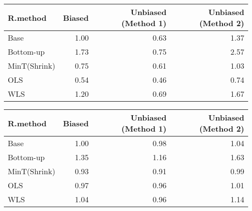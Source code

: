 \documentclass[
]{article}
\begin{document}
\begin{tabular}{l|r|r|r}
\hline
R.method & Biased & Unbiased (Method 1) & Unbiased (Method 2)\\\hline
Base & 1.00 & 0.63 & 1.37\\\hline
Bottom-up & 1.73 & 0.75 & 2.57\\\hline
MinT(Shrink) & 0.75 & 0.61 & 1.03\\\hline
OLS & 0.54 & 0.46 & 0.74\\\hline
WLS & 1.20 & 0.69 & 1.67\\\hline
\end{tabular}

\begin{tabular}{l|r|r|r}
\hline
R.method & Biased & Unbiased (Method 1) & Unbiased (Method 2)\\
\hline
Base & 1.00 & 0.98 & 1.04\\\hline
Bottom-up & 1.35 & 1.16 & 1.63\\\hline
MinT(Shrink) & 0.93 & 0.91 & 0.99\\\hline
OLS & 0.97 & 0.96 & 1.01\\\hline
WLS & 1.04 & 0.96 & 1.14\\\hline
\end{tabular}
\end{document}
